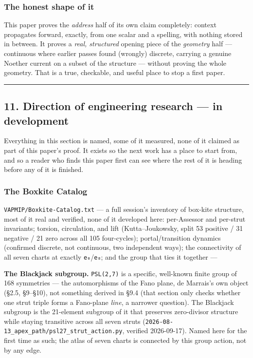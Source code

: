 \documentclass[
  10pt,
]{article}
\begin{document}
\hypertarget{the-honest-shape-of-it}{%
\subsubsection{The honest shape of it}\label{the-honest-shape-of-it}}

This paper proves the \emph{address} half of its own claim completely:
context propagates forward, exactly, from one scalar and a spelling,
with nothing stored in between. It proves a \emph{real, structured}
opening piece of the \emph{geometry} half --- continuous where earlier
passes found (wrongly) discrete, carrying a genuine Noether current on a
subset of the structure --- without proving the whole geometry. That is
a true, checkable, and useful place to stop a first paper.

\begin{center}\rule{0.5\linewidth}{0.5pt}\end{center}

\hypertarget{direction-of-engineering-research-in-development}{%
\subsection{11. Direction of engineering research --- in
development}\label{direction-of-engineering-research-in-development}}

Everything in this section is named, some of it measured, none of it
claimed as part of this paper's proof. It exists so the next work has a
place to start from, and so a reader who finds this paper first can see
where the rest of it is heading before any of it is finished.

\hypertarget{the-boxkite-catalog}{%
\subsubsection{The Boxkite Catalog}\label{the-boxkite-catalog}}

\texttt{VAPMIP/Boxkite-Catalog.txt} --- a full session's inventory of
box-kite structure, most of it real and verified, none of it developed
here: per-Assessor and per-strut invariants; torsion, circulation, and
lift (Kutta--Joukowsky, split 53 positive / 31 negative / 21 zero across
all 105 four-cycles); portal/transition dynamics (confirmed discrete,
not continuous, two independent ways); the connectivity of all seven
charts at exactly \texttt{e₀}/\texttt{e₈}; and the group that ties it
together ---

\textbf{The Blackjack subgroup.} \texttt{PSL(2,7)} is a specific,
well-known finite group of 168 symmetries --- the automorphisms of the
Fano plane, de Marrais's own object (§2.5, §9--§10), not something
derived in §9.4 (that section only checks whether one strut triple forms
a Fano-plane \emph{line}, a narrower question). The Blackjack subgroup
is the 21-element subgroup of it that preserves zero-divisor structure
while staying transitive across all seven struts
(\texttt{2026-08-13\_apex\_path/psl27\_strut\_action.py}, verified
2026-09-17). Named here for the first time as such; the atlas of seven
charts is connected by this group action, not by any edge.
\end{document}
